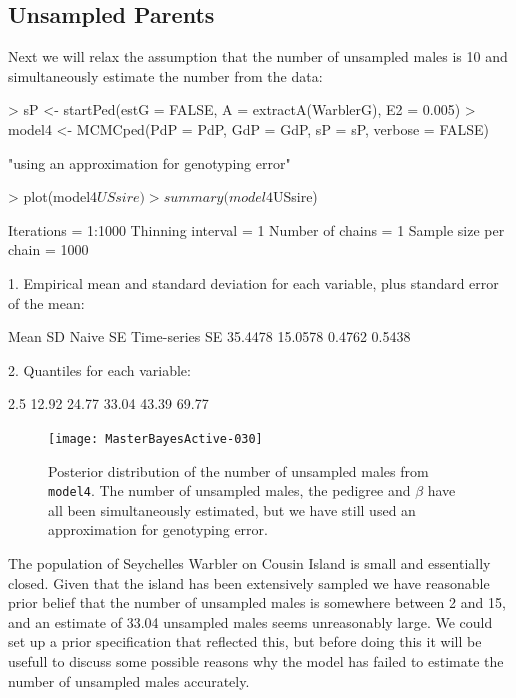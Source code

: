 \documentclass{article}
\begin{document}
\subsection{Unsampled Parents}
\label{us-sec}

Next we will relax the assumption that the number of unsampled males is 10 and simultaneously estimate the number from the data:

\begin{Schunk}
\begin{Sinput}
> sP <- startPed(estG = FALSE, A = extractA(WarblerG), E2 = 0.005)
> model4 <- MCMCped(PdP = PdP, GdP = GdP, sP = sP, verbose = FALSE)
\end{Sinput}
\begin{Soutput}
[1] "using an approximation for genotyping error"
\end{Soutput}
\begin{Sinput}
> plot(model4$USsire)
> summary(model4$USsire)
\end{Sinput}
\begin{Soutput}
Iterations = 1:1000
Thinning interval = 1 
Number of chains = 1 
Sample size per chain = 1000 

1. Empirical mean and standard deviation for each variable,
   plus standard error of the mean:

          Mean             SD       Naive SE Time-series SE 
       35.4478        15.0578         0.4762         0.5438 

2. Quantiles for each variable:

 2.5%
12.92 24.77 33.04 43.39 69.77 
\end{Soutput}
\end{Schunk}


\begin{figure}[!h]
\begin{center}
\texttt{[image: MasterBayesActive-030]}
\end{center}
\caption{Posterior distribution of the number of unsampled males from \texttt{model4}. The number of unsampled males, the pedigree and $\beta$ have all been simultaneously estimated, but we have still used an approximation for genotyping error.}
\label{model4US-fig}
\end{figure}

The population of Seychelles Warbler on Cousin Island is small and essentially closed. Given that the island has been extensively sampled we have reasonable prior belief that the number of unsampled males is somewhere between 2 and 15, and an estimate of 33.04 unsampled males seems unreasonably large.  We could set up a prior specification that reflected this, but before doing this it will be usefull to discuss some possible reasons why the model has failed to estimate the number of unsampled males accurately.\\
\end{document}
